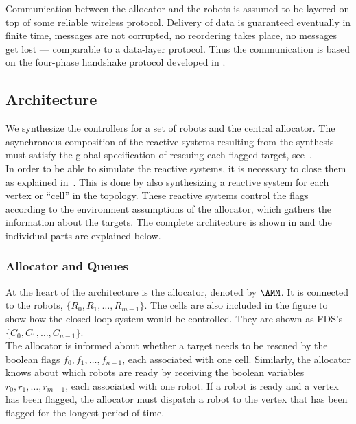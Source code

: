 Communication between the allocator and the robots is assumed to be layered on top of some reliable wireless protocol. Delivery of data is guaranteed eventually in finite time, messages are not corrupted, no reordering takes place, no messages get lost --- comparable to a data-layer protocol. Thus the communication is based on the four-phase handshake protocol developed in .\\




\subsection{Architecture} \label{sec:statarch} 

We synthesize the controllers for a set of robots and the central allocator. The asynchronous composition of the reactive systems resulting from the synthesis must satisfy the global specification of rescuing each flagged target, see~.\\

In order to be able to simulate the reactive systems, it is necessary to close them as explained in~. This is done by also synthesizing a reactive system for each vertex or ``cell'' in the topology. These reactive systems control the flags according to the environment assumptions of the allocator, which gathers the information about the targets. The complete architecture is shown in  and the individual parts are explained below.\\




\subsubsection{Allocator and Queues}

At the heart of the architecture is the allocator, denoted by $\AMM$. It is connected to the robots, $\{R_0, R_1, \ldots, R_{m-1} \}$. The cells are also included in the figure to show how the closed-loop system would be controlled. They are shown as FDS's $\{C_0, C_1, \ldots, C_{n-1}\}$.\\

The allocator is informed about whether a target needs to be rescued by the boolean flags $f_0, f_1, \ldots, f_{n-1}$, each associated with one cell. Similarly, the allocator knows about which robots are ready by receiving the boolean variables $r_0, r_1, \ldots, r_{m-1}$, each associated with one robot. If a robot is ready and a vertex has been flagged, the allocator must dispatch a robot to the vertex that has been flagged for the longest period of time.\\

